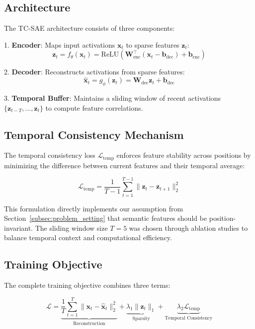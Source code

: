 \documentclass{article} %
\begin{document}
\subsection{Architecture}
The TC-SAE architecture consists of three components:

1. \textbf{Encoder}: Maps input activations $\mathbf{x}_t$ to sparse features $\mathbf{z}_t$:
\begin{equation}
\mathbf{z}_t = f_\theta(\mathbf{x}_t) = \text{ReLU}(\mathbf{W}_{\text{enc}}^\top (\mathbf{x}_t - \mathbf{b}_{\text{dec}}) + \mathbf{b}_{\text{enc}})
\end{equation}

2. \textbf{Decoder}: Reconstructs activations from sparse features:
\begin{equation}
\hat{\mathbf{x}}_t = g_\phi(\mathbf{z}_t) = \mathbf{W}_{\text{dec}} \mathbf{z}_t + \mathbf{b}_{\text{dec}}
\end{equation}

3. \textbf{Temporal Buffer}: Maintains a sliding window of recent activations $\{\mathbf{z}_{t-T}, ..., \mathbf{z}_t\}$ to compute feature correlations.

\subsection{Temporal Consistency Mechanism}
The temporal consistency loss $\mathcal{L}_{\text{temp}}$ enforces feature stability across positions by minimizing the difference between current features and their temporal average:

\begin{equation}
\mathcal{L}_{\text{temp}} = \frac{1}{T-1}\sum_{t=1}^{T-1} \|\mathbf{z}_t - \mathbf{z}_{t+1}\|_2^2
\end{equation}

This formulation directly implements our assumption from Section~\ref{subsec:problem_setting} that semantic features should be position-invariant. The sliding window size $T=5$ was chosen through ablation studies to balance temporal context and computational efficiency.

\subsection{Training Objective}
The complete training objective combines three terms:

\begin{equation}
\mathcal{L} = \underbrace{\frac{1}{T}\sum_{t=1}^T \|\mathbf{x}_t - \hat{\mathbf{x}}_t\|_2^2}_{\text{Reconstruction}} + \underbrace{\lambda_1\|\mathbf{z}_t\|_1}_{\text{Sparsity}} + \underbrace{\lambda_2\mathcal{L}_{\text{temp}}}_{\text{Temporal Consistency}}
\end{equation}
\end{document}
